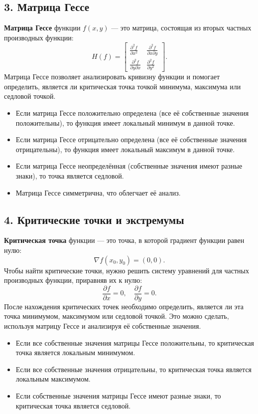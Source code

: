 \documentclass[a4paper,12pt]{article}
\begin{document}
\subsection*{3. Матрица Гессе}

\textbf{Матрица Гессе} функции \( f(x, y) \) — это матрица, состоящая из вторых частных производных функции:
\[
H(f) =
\begin{bmatrix}
\frac{\partial^2 f}{\partial x^2} & \frac{\partial^2 f}{\partial x \partial y} \\
\frac{\partial^2 f}{\partial y \partial x} & \frac{\partial^2 f}{\partial y^2}
\end{bmatrix}.
\]
Матрица Гессе позволяет анализировать кривизну функции и помогает определить, является ли критическая точка точкой минимума, максимума или седловой точкой.

\begin{itemize}
    \item Если матрица Гессе положительно определена (все её собственные значения положительны), то функция имеет локальный минимум в данной точке.
    \item Если матрица Гессе отрицательно определена (все её собственные значения отрицательны), то функция имеет локальный максимум в данной точке.
    \item Если матрица Гессе неопределённая (собственные значения имеют разные знаки), то точка является седловой.
    \item Матрица Гессе симметрична, что облегчает её анализ.
\end{itemize}

\subsection*{4. Критические точки и экстремумы}

\textbf{Критическая точка} функции — это точка, в которой градиент функции равен нулю:
\[
\nabla f(x_0, y_0) = (0, 0).
\]
Чтобы найти критические точки, нужно решить систему уравнений для частных производных функции, приравняв их к нулю:
\[
\frac{\partial f}{\partial x} = 0, \quad \frac{\partial f}{\partial y} = 0.
\]
После нахождения критических точек необходимо определить, является ли эта точка минимумом, максимумом или седловой точкой. Это можно сделать, используя матрицу Гессе и анализируя её собственные значения.

\begin{itemize}
    \item Если все собственные значения матрицы Гессе положительны, то критическая точка является локальным минимумом.
    \item Если все собственные значения отрицательны, то критическая точка является локальным максимумом.
    \item Если собственные значения матрицы Гессе имеют разные знаки, то критическая точка является седловой.
\end{itemize}
\end{document}
